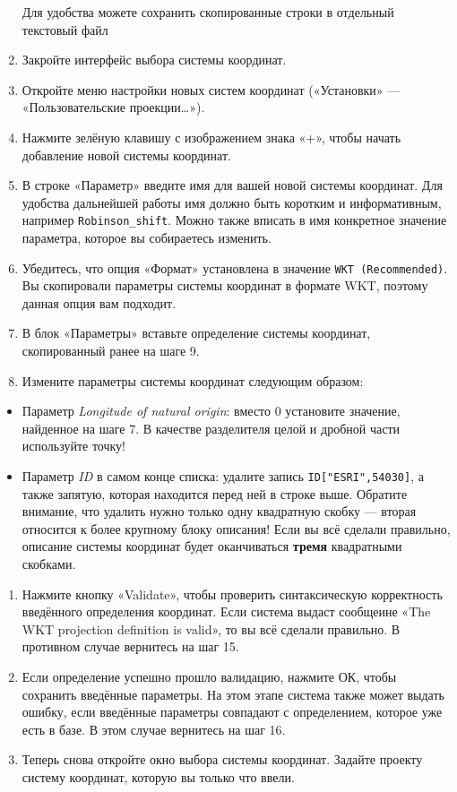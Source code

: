 \documentclass[
  12pt,
]{book}
\providecommand{\tightlist}{%
  \setlength{\itemsep}{0pt}\setlength{\parskip}{0pt}}
\begin{document}
\begin{enumerate}
  Для удобства можете сохранить скопированные строки в отдельный текстовый файл
\item
  Закройте интерфейс выбора системы координат.
\item
  Откройте меню настройки новых систем координат («Установки» --- «Пользовательские проекции\ldots»).
\item
  Нажмите зелёную клавишу с изображением знака «+», чтобы начать добавление новой системы координат.
\item
  В строке «Параметр» введите имя для вашей новой системы координат. Для удобства дальнейшей работы имя должно быть коротким и информативным, например \texttt{Robinson\_shift}. Можно также вписать в имя конкретное значение параметра, которое вы собираетесь изменить.
\item
  Убедитесь, что опция «Формат» установлена в значение \texttt{WKT\ (Recommended)}. Вы скопировали параметры системы координат в формате WKT, поэтому данная опция вам подходит.
\item
  В блок «Параметры» вставьте определение системы координат, скопированный ранее на шаге 9.
\item
  Измените параметры системы координат следующим образом:
\end{enumerate}

\begin{itemize}
\tightlist
\item
  Параметр \emph{Longitude of natural origin}: вместо 0 установите значение, найденное на шаге 7. В качестве разделителя целой и дробной части используйте точку!
\item
  Параметр \emph{ID} в самом конце списка: удалите запись \texttt{ID{[}"ESRI",54030{]}}, а также запятую, которая находится перед ней в строке выше. Обратите внимание, что удалить нужно только одну квадратную скобку --- вторая относится к более крупному блоку описания! Если вы всё сделали правильно, описание системы координат будет оканчиваться \textbf{тремя} квадратными скобками.
\end{itemize}

\begin{enumerate}
\def\labelenumi{\arabic{enumi}.}
\setcounter{enumi}{16}
\item
  Нажмите кнопку «Validate», чтобы проверить синтаксическую корректность введённого определения координат. Если система выдаст сообщеине «The WKT projection definition is valid», то вы всё сделали правильно. В противном случае вернитесь на шаг 15.
\item
  Если определение успешно прошло валидацию, нажмите ОК, чтобы сохранить введённые параметры. На этом этапе система также может выдать ошибку, если введённые параметры совпадают с определением, которое уже есть в базе. В этом случае вернитесь на шаг 16.
\item
  Теперь снова откройте окно выбора системы координат. Задайте проекту систему координат, которую вы только что ввели.
\end{enumerate}
\end{document}
